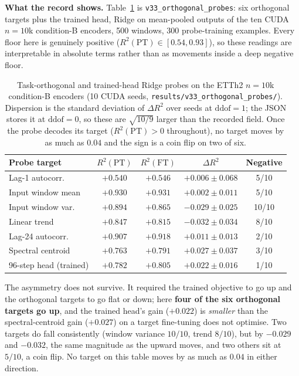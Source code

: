 \textbf{What the record shows.}  Table~\ref{tab:orthogonal} is
\texttt{v33\_orthogonal\_probes}: six orthogonal targets plus the trained head,
Ridge on mean-pooled outputs of the ten CUDA $n{=}10$k condition-B encoders, 500
windows, 300 probe-training examples.  Every floor here is genuinely positive
($R^2(\text{PT}) {\in} [0.54, 0.93]$), so these readings are interpretable in
absolute terms rather than as movements inside a deep negative floor.

\begin{table}[ht]
\centering
\caption{Task-orthogonal and trained-head Ridge probes on the ETTh2 $n{=}10$k
condition-B encoders (10 CUDA seeds, \texttt{results/v33\_orthogonal\_probes/}).
Dispersion is the standard deviation of $\Delta R^2$ over seeds at
$\text{ddof}{=}1$; the JSON stores it at $\text{ddof}{=}0$, so these are
$\sqrt{10/9}$ larger than the recorded field.  Once the probe
decodes its target ($R^2(\text{PT}){>}0$ throughout), no target moves by as much
as $0.04$ and the sign is a coin flip on two of six.}
\label{tab:orthogonal}
\small
\begin{tabular}{lcccc}
\toprule
Probe target & $R^2(\text{PT})$ & $R^2(\text{FT})$ & $\Delta R^2$ & Negative \\
\midrule
Lag-1 autocorr.    & $+0.540$ & $+0.546$ & $+0.006{\pm}0.068$ & 5/10 \\
Input window mean  & $+0.930$ & $+0.931$ & $+0.002{\pm}0.011$ & 5/10 \\
Input window var.  & $+0.894$ & $+0.865$ & $-0.029{\pm}0.025$ & 10/10 \\
Linear trend       & $+0.847$ & $+0.815$ & $-0.032{\pm}0.034$ & 8/10 \\
Lag-24 autocorr.   & $+0.907$ & $+0.918$ & $+0.011{\pm}0.013$ & 2/10 \\
Spectral centroid  & $+0.763$ & $+0.791$ & $+0.027{\pm}0.037$ & 3/10 \\
\midrule
96-step head (trained) & $+0.782$ & $+0.805$ & $+0.022{\pm}0.016$ & 1/10 \\
\bottomrule
\end{tabular}
\end{table}

The asymmetry does not survive.  It required the trained objective to go up and
the orthogonal targets to go flat or down; here \textbf{four of the six
orthogonal targets go up}, and the trained head's gain ($+0.022$) is
\emph{smaller} than the spectral-centroid gain ($+0.027$) on a target
fine-tuning does not optimise.  Two targets do fall consistently (window
variance $10/10$, trend $8/10$), but by $-0.029$ and $-0.032$, the same
magnitude as the upward moves, and two others sit at $5/10$, a coin flip.  No
target on this table moves by as much as $0.04$ in either direction.

